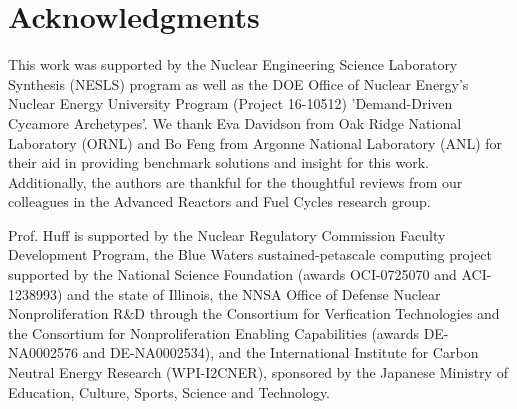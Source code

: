 \section{Acknowledgments}
This work was supported by the Nuclear Engineering Science Laboratory Synthesis 
(NESLS) program as well as the DOE Office of Nuclear Energy's Nuclear Energy 
University Program (Project 16-10512) 'Demand-Driven Cycamore Archetypes'. We 
thank Eva Davidson from Oak Ridge National Laboratory (ORNL) and Bo Feng from 
Argonne National Laboratory (ANL) for their aid in providing benchmark 
solutions and insight for this work. Additionally, the authors are thankful for 
the thoughtful reviews from our colleagues in the Advanced Reactors and Fuel 
Cycles research group.

Prof. Huff is supported by the Nuclear Regulatory Commission Faculty 
Development Program, the Blue Waters sustained-petascale computing project 
supported by the National Science Foundation (awards OCI-0725070 and 
ACI-1238993) and the state of Illinois, the NNSA Office of Defense Nuclear 
Nonproliferation R\&D through the Consortium for Verfication Technologies and 
the Consortium for Nonproliferation Enabling Capabilities (awards DE-NA0002576 
and DE-NA0002534), and the International Institute for Carbon Neutral Energy 
Research (WPI-I2CNER), sponsored by the Japanese Ministry of Education, 
Culture, Sports, Science and Technology.


